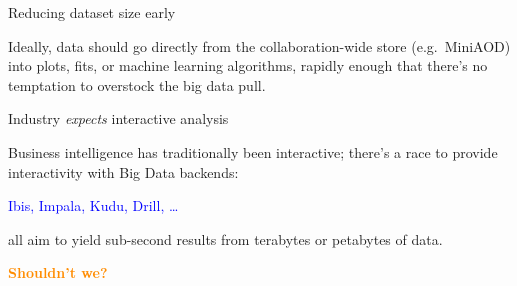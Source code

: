 \documentclass{beamer}
\begin{document}
\begin{frame}{Reducing dataset size early}
\begin{center}
\end{center}

Ideally, data should go directly from the collaboration-wide store (e.g.\ MiniAOD) into plots, fits, or machine learning algorithms, rapidly enough that there's no temptation to overstock the big data pull.
\end{frame}

\begin{frame}{Industry {\it expects} interactive analysis}

Business intelligence has traditionally been interactive; there's a race to provide interactivity with Big Data backends:

\begin{center}
\textcolor{blue}{Ibis, Impala, Kudu, Drill, \ldots}
\end{center}

all aim to yield sub-second results from terabytes or petabytes of data.

\vfill
\textcolor{darkorange}{\bf Shouldn't we?}
\end{frame}
\end{document}
